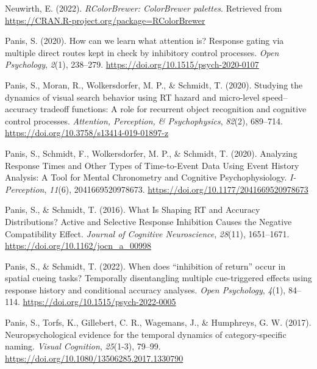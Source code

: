 \documentclass[
  man, donotrepeattitle,floatsintext]{apa6}
\newlength{\cslhangindent}
\newenvironment{CSLReferences}[2] %
 {\begin{list}{}{%
  \setlength{\itemindent}{0pt}
  \setlength{\leftmargin}{0pt}
  \setlength{\parsep}{0pt}
  \ifodd #1
   \setlength{\leftmargin}{\cslhangindent}
   \setlength{\itemindent}{-1\cslhangindent}
  \fi
  \setlength{\itemsep}{#2\baselineskip}}}
 {\end{list}}
\begin{document}
\begin{CSLReferences}{1}{0}
Neuwirth, E. (2022). \emph{RColorBrewer: ColorBrewer palettes}. Retrieved from \url{https://CRAN.R-project.org/package=RColorBrewer}

Panis, S. (2020). How can we learn what attention is? {Response} gating via multiple direct routes kept in check by inhibitory control processes. \emph{Open Psychology}, \emph{2}(1), 238--279. \url{https://doi.org/10.1515/psych-2020-0107}

Panis, S., Moran, R., Wolkersdorfer, M. P., \& Schmidt, T. (2020). Studying the dynamics of visual search behavior using {RT} hazard and micro-level speed--accuracy tradeoff functions: {A} role for recurrent object recognition and cognitive control processes. \emph{Attention, Perception, \& Psychophysics}, \emph{82}(2), 689--714. \url{https://doi.org/10.3758/s13414-019-01897-z}

Panis, S., Schmidt, F., Wolkersdorfer, M. P., \& Schmidt, T. (2020). Analyzing {Response Times} and {Other Types} of {Time-to-Event Data Using Event History Analysis}: {A Tool} for {Mental Chronometry} and {Cognitive Psychophysiology}. \emph{I-Perception}, \emph{11}(6), 2041669520978673. \url{https://doi.org/10.1177/2041669520978673}

Panis, S., \& Schmidt, T. (2016). What {Is Shaping RT} and {Accuracy Distributions}? {Active} and {Selective Response Inhibition Causes} the {Negative Compatibility Effect}. \emph{Journal of Cognitive Neuroscience}, \emph{28}(11), 1651--1671. \url{https://doi.org/10.1162/jocn_a_00998}

Panis, S., \& Schmidt, T. (2022). When does {``inhibition of return''} occur in spatial cueing tasks? {Temporally} disentangling multiple cue-triggered effects using response history and conditional accuracy analyses. \emph{Open Psychology}, \emph{4}(1), 84--114. \url{https://doi.org/10.1515/psych-2022-0005}

Panis, S., Torfs, K., Gillebert, C. R., Wagemans, J., \& Humphreys, G. W. (2017). Neuropsychological evidence for the temporal dynamics of category-specific naming. \emph{Visual Cognition}, \emph{25}(1-3), 79--99. \url{https://doi.org/10.1080/13506285.2017.1330790}


\end{CSLReferences}
\end{document}
